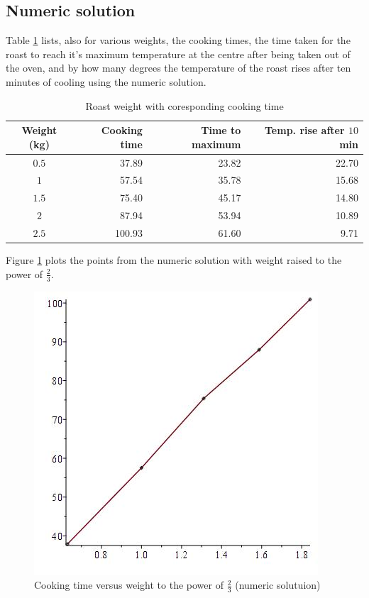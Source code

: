 \documentclass{report}
\begin{document}
\subsection{Numeric solution}

Table \ref{tab:ctvrwn} lists, also for various weights, the cooking times, the time taken for the roast to reach it's 
maximum temperature at the centre after being taken out of the oven, and by how many degrees the temperature of the roast 
rises after ten minutes of cooling using the numeric solution.\bigskip

\begin{table}[h]
\centering
\begin{tabular}{ c | r | r | r }
Weight (kg) & Cooking time & Time to maximum & Temp. rise after $10$ min \\
\hline
$0.5$ & 37.89 & 23.82 & 22.70 \\
\hline
$1$   & 57.54 & 35.78 & 15.68 \\
\hline
$1.5$ & 75.40 & 45.17 & 14.80 \\
\hline
$2$   & 87.94 & 53.94 & 10.89 \\
\hline
$2.5$ & 100.93 & 61.60 & 9.71 
\end{tabular}
\caption{Roast weight with coresponding cooking time}
\label{tab:ctvrwn}
\end{table}

Figure \ref{fig:ctvwn} plots the points from the numeric solution with weight raised to the power of $\frac{2}{3}$.\bigskip

\begin{figure}[h]
\centering
\includegraphics[scale = 0.25]{cooking-time-versus-weight-numeric}
\caption{Cooking time versus weight to the power of $\frac{2}{3}$ (numeric solutuion)}
\label{fig:ctvwn}
\end{figure}
\end{document}
